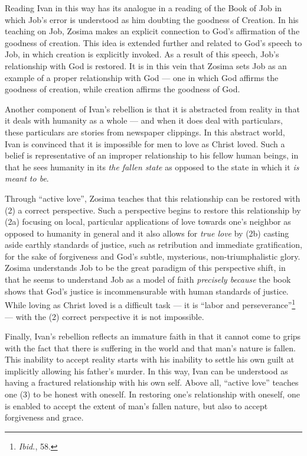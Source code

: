 Reading Ivan in this way has its analogue in a reading of the Book of Job in which Job's error is understood as him doubting the goodness of Creation. In his teaching on Job, Zosima makes an explicit connection to God's affirmation of the goodness of creation. This idea is extended further and related to God's speech to Job, in which creation is explicitly invoked. As a result of this speech, Job's relationship with God is restored. It is in this vein that Zosima sets Job as an example of a proper relationship with God --- one in which God affirms the goodness of creation, while creation affirms the goodness of God.

Another component of Ivan's rebellion is that it is abstracted from reality in that it deals with humanity as a whole --- and when it does deal with particulars, these particulars are stories from newspaper clippings. In this abstract world, Ivan is convinced that it is impossible for men to love as Christ loved. Such a belief is representative of an improper relationship to his fellow human beings, in that he sees humanity in its \emph{the fallen state} as opposed to the state in which it \emph{is meant to be}. 

Through ``active love'', Zosima teaches that this relationship can be restored with (2) a correct perspective. Such a perspective begins to restore this relationship by (2a) focusing on local, particular applications of love towards one's neighbor as opposed to humanity in general and it also allows for \emph{true love} by (2b) casting aside earthly standards of justice, such as retribution and immediate gratification, for the sake of forgiveness and God's subtle, mysterious, non-triumphalistic glory. Zosima understands Job to be the great paradigm of this perspective shift, in that he seems to understand Job as a model of faith \emph{precisely because} the book shows that God's justice is incommensurable with human standards of justice. While loving as Christ loved is a difficult task --- it is ``labor and perseverance''\footnote{\emph{Ibid.}, 58.} --- with the (2) correct perspective it is not impossible.

Finally, Ivan's rebellion reflects an immature faith in that it cannot come to grips with the fact that there is suffering in the world and that man's nature is fallen. This inability to accept reality starts with his inability to settle his own guilt at implicitly allowing his father's murder. In this way, Ivan can be understood as having a fractured relationship with his own self. Above all, ``active love'' teaches one (3) to be honest with oneself. In restoring one's relationship with oneself, one is enabled to accept the extent of man's fallen nature, but also to accept forgiveness and grace. 

